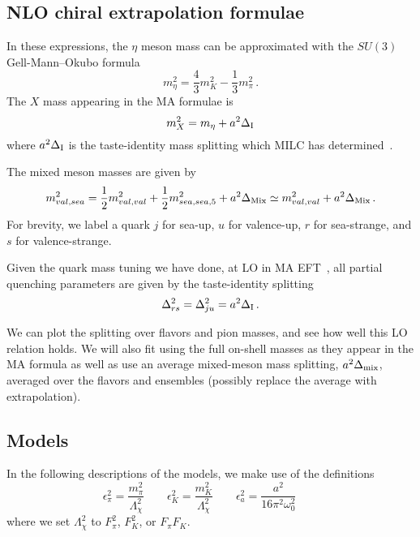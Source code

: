 \documentclass[prd,tightenlines,preprintnumbers,showpacs,superscriptaddress,notitlepage,eqsecnum,floatfix,notitlepage]{revtex4-1}
\begin{document}
\subsection{NLO chiral extrapolation formulae}

In these expressions, the $\eta$ meson mass can be approximated with the $SU(3)$ Gell-Mann--Okubo formula
\begin{equation}
m_\eta^2 = \frac{4}{3} m_K^2 - \frac{1}{3}m_\pi^2\, .
\end{equation}
The $X$ mass appearing in the MA formulae is
\begin{equation}
m_X^2 = m_\eta + a^2 \Delta_{\rm I}
\end{equation}
where $a^2 \Delta_{\rm I}$ is the taste-identity mass splitting which MILC has determined~\cite{Bazavov:2012xda}.

The mixed meson masses are given by
\begin{equation}
m_{val,sea}^2 = \frac{1}{2}m_{val,val}^2 + \frac{1}{2}m_{sea,sea,5}^2 + a^2 \Delta_{\rm Mix}
\simeq m_{val,val}^2 + a^2 \Delta_{\rm Mix}\, .
\end{equation}
For brevity, we label a quark $j$ for sea-up, $u$ for valence-up, $r$ for sea-strange, and $s$ for valence-strange.

Given the quark mass tuning we have done, at LO in MA EFT~\cite{Chen:2006wf}, all partial quenching parameters are given by the taste-identity splitting
\begin{equation}
\Delta_{rs}^2 = \Delta_{ju}^2 = a^2 \Delta_{\rm I}\, .
\end{equation}

We can plot the splitting over flavors and pion masses, and see how well this LO relation holds.  We will also fit using the full on-shell masses as they appear in the MA formula as well as use an average mixed-meson mass splitting, $a^2 \Delta_{\rm mix}$, averaged over the flavors and ensembles (possibly replace the average with extrapolation).





\subsection{Models}
In the following descriptions of the models, we make use of the definitions
\begin{equation}
\epsilon_\pi^2 = \frac{m_\pi^2}{\Lambda_\chi^2} \qquad
\epsilon_K^2 = \frac{m_K^2}{\Lambda_\chi^2} \qquad
\epsilon_a^2 = \frac{a^2}{16 \pi ^2\omega_0^2} \qquad
\end{equation}
where we set $\Lambda_\chi^2$ to $F_\pi^2$, $F_K^2$, or $F_\pi F_K$.
\end{document}
